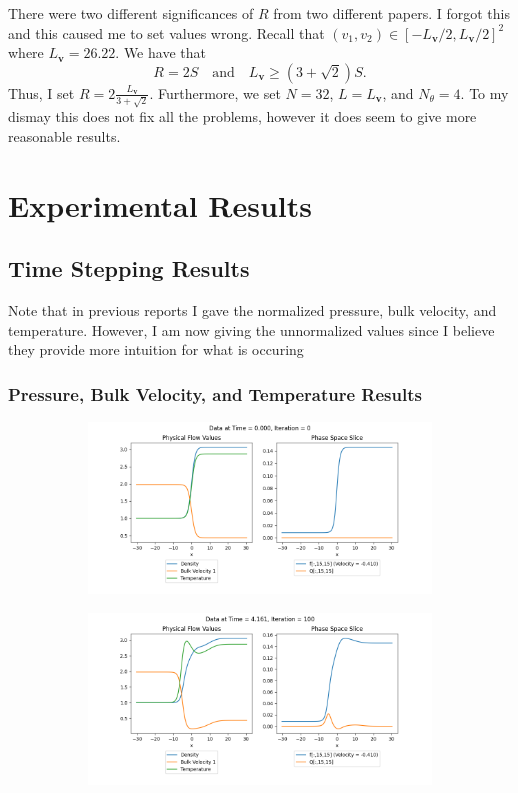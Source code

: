 \documentclass{article}
\def\b{\mathbf}
\def\t{\text}
\begin{document}
There were two different significances of $R$ from two different papers. I forgot this and this caused me to set values wrong. Recall that $(v_1,v_2) \in [-L_{\b v}/2,L_{\b v}/2]^2$ where $L_{\b v} = 26.22$. We have that 
\[
  R = 2S \quad \t{and} \quad L_{\b v} \geq (3 + \sqrt{2}) S.
\]
Thus, I set $R = 2\frac{L_{\b v}}{3 + \sqrt{2}}$. Furthermore, we set $N=32$, $L = L_{\b v}$, and $N_{\theta} = 4$. To my dismay this does not fix all the problems, however it does seem to give more reasonable results.
\section{Experimental Results}
\subsection{Time Stepping Results}
Note that in previous reports I gave the normalized pressure, bulk velocity, and temperature. However, I am now giving the unnormalized values since I believe they provide more intuition for what is occuring
\subsubsection{Pressure, Bulk Velocity, and Temperature Results}
\begin{figure}[H]
  \begin{subfigure}[b]{\textwidth}
  \includegraphics[width=\textwidth]{imgs/ts_output2/plots/plot0.png}
  \end{subfigure}
  \hfill
  \begin{subfigure}[b]{\textwidth}
  \includegraphics[width=\textwidth]{imgs/ts_output2/plots/plot100.png}
  \end{subfigure}
\end{figure}
\end{document}
